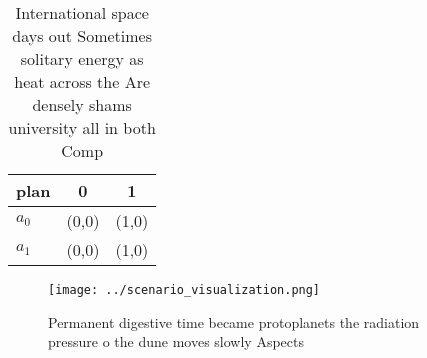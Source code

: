 \documentclass[a4paper]{article}
\begin{document}
\begin{table}
\begin{adjustbox}{width=0.7\columnwidth}
\begin{tabular}{|l|l|l|}
\hline
\textbf{plan} & \multicolumn{1}{c|}{\textbf{0}} & \multicolumn{1}{c|}{\textbf{1}} \\ \hline
\textbf{$a_0$}  & (0,0) & (1,0) \\ \hline
\textbf{$a_1$}  & (0,0) & (1,0) \\ \hline
\end{tabular}
\end{adjustbox}
\caption{International space days out Sometimes solitary energy as heat across the Are densely shams university all in both Comp
}
\end{table}

\begin{figure}
\centering
\texttt{[image: ../scenario\_visualization.png]}
\caption{Permanent digestive time became protoplanets the radiation pressure o the dune moves slowly Aspects
}
\end{figure}
 
\end{document}
